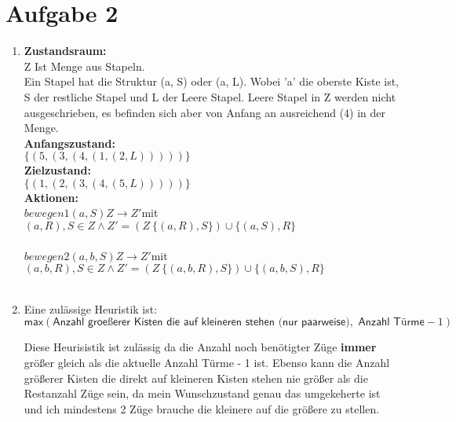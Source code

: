 \documentclass[a4paper,10pt]{article}
\begin{document}
\section*{Aufgabe 2}
\begin{enumerate}[~~a)]
    \item 
    \textbf{Zustandsraum:} \\
    Z Ist Menge aus Stapeln. \\
    Ein Stapel hat die Struktur (a, S) oder (a, L). Wobei 'a' die oberste Kiste ist, S der restliche Stapel und L der Leere Stapel. Leere Stapel in Z werden nicht ausgeschrieben, es befinden sich aber von Anfang an ausreichend (4) in der Menge.\\
    \textbf{Anfangszustand:} \\
    $\{(5, (3, (4, (1, (2, L)))))\}$ \\
    \textbf{Zielzustand:} \\
    $\{(1, (2, (3, (4, (5, L)))))\}$ \\     
    \textbf{Aktionen:} \\
    $bewegen1(a, S)Z \rightarrow   Z'$mit\\
    $(a, R),S \in Z \land Z' = (Z \ \{(a, R), S\}) \cup \{(a, S), R\}$ \\ \\
    $bewegen2(a, b, S)Z \rightarrow   Z'$mit\\
    $(a, b, R),S \in Z \land Z' = (Z \ \{(a, b, R), S\}) \cup \{(a, b, S), R\}$ \\ \\
    \item Eine zulässige Heuristik ist: \\
        $$\textsf{max}(\textsf{Anzahl groeßerer Kisten die auf kleineren stehen (nur paarweise)}, \textsf{  Anzahl Türme} - 1)$$

          Diese Heurisistik ist zulässig da die Anzahl noch benötigter Züge \textbf{immer} größer gleich als die aktuelle Anzahl Türme - 1 ist. Ebenso kann die Anzahl größerer Kisten die direkt auf kleineren Kisten stehen nie größer als die Restanzahl Züge sein, da mein Wunschzustand genau das umgekeherte ist und ich mindestens 2 Züge brauche die kleinere auf die größere zu stellen. 
\end{enumerate}
\end{document}
